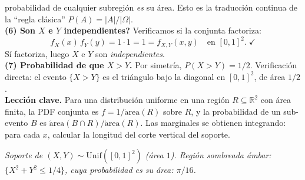 \documentclass[10pt,a4paper]{article}
\numberwithin{equation}{section}
\newcommand{\R}{\mathbb{R}}
\newcounter{excount}[section]
\renewcommand{\theexcount}{\thesection.\arabic{excount}}
\newenvironment{ejemplo}[1]{%
  \refstepcounter{excount}%
  \begin{tcolorbox}[exbox, title={Ejemplo \theexcount\ \textperiodcentered\ #1}]%
}{\end{tcolorbox}}
\begin{document}
\begin{ejemplo}{Uniforme en el cuadrado unitario}
  probabilidad de cualquier subregi\'on \emph{es} su \'area. Esto es la traducci\'on continua
  de la ``regla cl\'asica'' $P(A) = |A|/|\Omega|$.
  \\[5pt]
  \textbf{(6) \textquestiondown Son $X$ e $Y$ independientes?} Verificamos si la conjunta
  factoriza:
  \[
    f_X(x)\,f_Y(y) = 1 \cdot 1 = 1 = f_{X,Y}(x,y) \quad \text{en } [0,1]^2. \;\checkmark
  \]
  S\'i factoriza, luego $X$ e $Y$ son \emph{independientes}.
  \\[5pt]
  \textbf{(7) Probabilidad de que $X > Y$.} Por simetr\'ia, $P(X > Y) = 1/2$. Verificaci\'on
  directa: el evento $\{X > Y\}$ es el tri\'angulo bajo la diagonal en $[0,1]^2$, de \'area $1/2$.
  \\[5pt]
  \textbf{Lecci\'on clave.} Para una distribuci\'on uniforme en una regi\'on $R \subseteq \R^2$
  con \'area finita, la PDF conjunta es $f = 1/\mathrm{\acute{a}rea}(R)$ sobre $R$, y la
  probabilidad de un sub-evento $B$ es $\mathrm{\acute{a}rea}(B \cap R)/\mathrm{\acute{a}rea}(R)$.
  Las marginales se obtienen integrando: para cada $x$, calcular la longitud del corte vertical
  del soporte.
\end{ejemplo}

\vspace{4pt}
\begin{center}
\end{center}
\begin{center}
  {\footnotesize\itshape Soporte de $(X,Y) \sim \mathrm{Unif}([0,1]^2)$ (\'area $1$). Regi\'on
    sombreada \'ambar: $\{X^2+Y^2 \leq 1/4\}$, cuya probabilidad es su \'area: $\pi/16$.}
\end{center}
\end{document}

